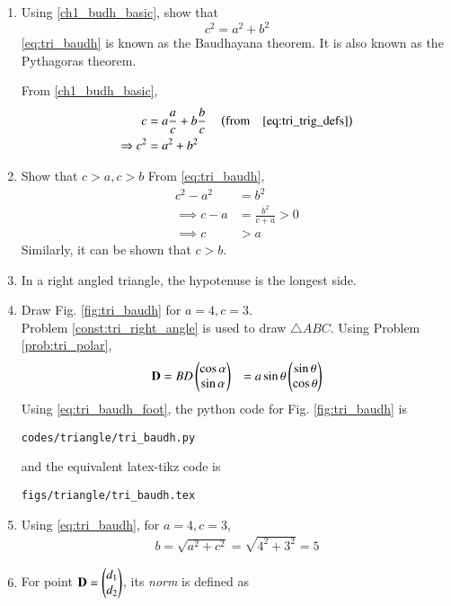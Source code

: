 \begin{enumerate}[label=\arabic*.,ref=\thesubsection.\theenumi]
\item
	Using \eqref{ch1_budh_basic}, show that
	\begin{equation}
	\label{eq:tri_baudh}
	c^2 = a^2 + b^2
	\end{equation}
	\eqref{eq:tri_baudh} is known as the Baudhayana theorem.  It is also known as the Pythagoras theorem.

\solution From \eqref{ch1_budh_basic},
\begin{align}
c &= a\frac{a}{c} + b \frac{b}{c} \quad \left(\text{from} \quad \eqref{eq:tri_trig_defs}\right)\\
\Rightarrow c^2 &= a^2 + b^2
\end{align}
%
\item Show that $c > a, c > b$
%
\solution From 	\eqref{eq:tri_baudh},
	\begin{align}
	c^2 - a^2 &= b^2
\\
\implies c-a &= \frac{b^2}{c+a} > 0 
\\
\implies c &> a
	\end{align}
%
Similarly, it can be shown that $c > b$.
\item In a right angled triangle, the hypotenuse is the longest side.
\label{them:hyp_largest}
\item Draw Fig. \ref{fig:tri_baudh} for $a = 4, c =3$.
\label{const:tri_baudh}
%
\\
\solution Problem \ref{const:tri_right_angle} is used to draw $\triangle ABC$.
%
Using Problem \ref{prob:tri_polar},
\begin{align}
\mathbf{D} &= BD\begin{pmatrix}\cos \alpha\\  \sin \alpha\end{pmatrix} 
&= a \sin \theta \begin{pmatrix} \sin \theta \\ \cos \theta \end{pmatrix} 
\label{eq:tri_baudh_foot}
\end{align}
%
Using \eqref{eq:tri_baudh_foot}, the python code for  Fig. \ref{fig:tri_baudh} is
\begin{lstlisting}
codes/triangle/tri_baudh.py
\end{lstlisting}
%
and the equivalent latex-tikz code is
%
\begin{lstlisting}
figs/triangle/tri_baudh.tex
\end{lstlisting}
%
\item Using 	\eqref{eq:tri_baudh}, for $a = 4, c = 3$,
%
\begin{align}
b = \sqrt{a^2+c^2} = \sqrt{4^2+3^2} = 5
\end{align}
%
\item For  point $\mathbf{D} = \begin{pmatrix}d_1\\d_2\end{pmatrix}$, its {\em norm} is defined as

\end{enumerate}
